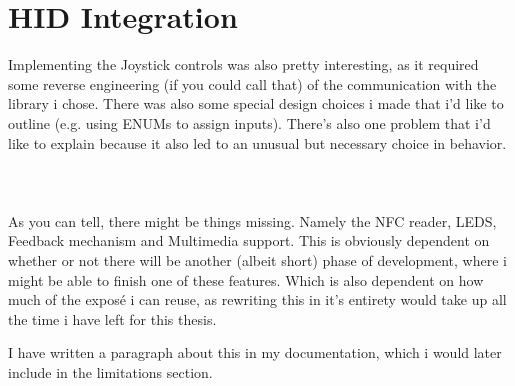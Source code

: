 \section{HID Integration}

Implementing the Joystick controls was also pretty interesting, as it required some reverse engineering (if you could call that) of the communication with the library i chose.
There was also some special design choices i made that i'd like to outline (e.g. using ENUMs to assign inputs).
There's also one problem that i'd like to explain because it also led to an unusual but necessary choice in behavior.\\\\\\\\


As you can tell, there might be things missing. Namely the NFC reader, LEDS, Feedback mechanism and Multimedia support.
This is obviously dependent on whether or not there will be another (albeit short) phase of development, where i might be able to finish one of these features. Which is also dependent on how much of the exposé i can reuse, as rewriting this in it's entirety would take up all the time i have left for this thesis.

I have written a paragraph about this in my documentation, which i would later include in the limitations section.